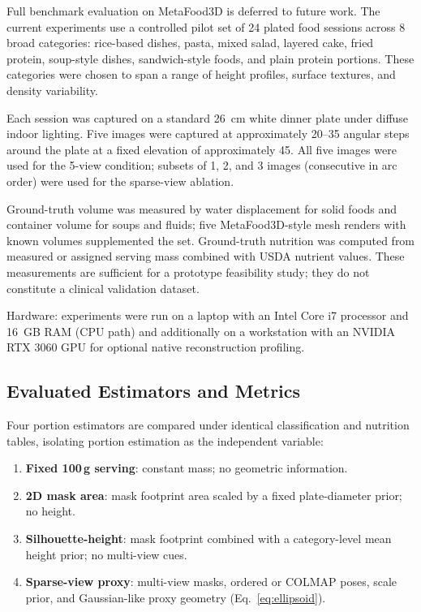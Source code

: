 \documentclass[conference]{IEEEtran}
\begin{document}
Full benchmark evaluation on MetaFood3D is deferred to future work. The
current experiments use a controlled pilot set of 24 plated food sessions
across 8 broad categories: rice-based dishes, pasta, mixed salad, layered
cake, fried protein, soup-style dishes, sandwich-style foods, and plain
protein portions. These categories were chosen to span a range of height
profiles, surface textures, and density variability.

Each session was captured on a standard 26~cm white dinner plate under
diffuse indoor lighting. Five images were captured at approximately 20--35\textdegree{}
angular steps around the plate at a fixed elevation of approximately 45\textdegree.
All five images were used for the 5-view condition; subsets of 1, 2, and 3
images (consecutive in arc order) were used for the sparse-view ablation.

Ground-truth volume was measured by water displacement for solid foods and
container volume for soups and fluids; five MetaFood3D-style mesh renders
with known volumes supplemented the set. Ground-truth nutrition was computed
from measured or assigned serving mass combined with USDA nutrient values.
These measurements are sufficient for a prototype feasibility study; they do
not constitute a clinical validation dataset.

Hardware: experiments were run on a laptop with an Intel Core i7 processor
and 16~GB RAM (CPU path) and additionally on a workstation with an NVIDIA
RTX 3060 GPU for optional native reconstruction profiling.

\subsection{Evaluated Estimators and Metrics}

Four portion estimators are compared under identical classification and
nutrition tables, isolating portion estimation as the independent variable:

\begin{enumerate}
    \item \textbf{Fixed 100\,g serving}: constant mass; no geometric information.
    \item \textbf{2D mask area}: mask footprint area scaled by a fixed
          plate-diameter prior; no height.
    \item \textbf{Silhouette-height}: mask footprint combined with a
          category-level mean height prior; no multi-view cues.
    \item \textbf{Sparse-view proxy}: multi-view masks, ordered or COLMAP
          poses, scale prior, and Gaussian-like proxy geometry
          (Eq.~\eqref{eq:ellipsoid}).
\end{enumerate}
\end{document}
